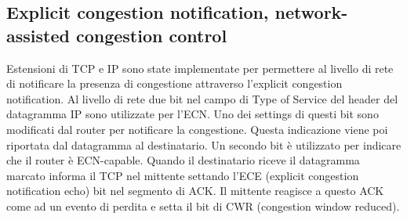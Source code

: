 \subsection{Explicit congestion notification, network-assisted congestion control}
Estensioni di TCP e IP sono state implementate per permettere al livello di rete di notificare la presenza di congestione attraverso l'explicit congestion
notification. Al livello di rete due bit nel campo di Type of Service del header del datagramma IP sono utilizzate per l'ECN. Uno dei settings di questi 
bit sono modificati dal router per notificare la congestione. Questa indicazione viene poi riportata dal datagramma al destinatario. Un secondo bit \`e 
utilizzato per indicare che il router \`e ECN-capable. Quando il destinatario riceve il datagramma marcato informa il TCP nel mittente settando l'ECE 
(explicit congestion notification echo) bit nel segmento di ACK. Il mittente reagisce a questo ACK come ad un evento di perdita e setta il bit di CWR
(congestion window reduced).
